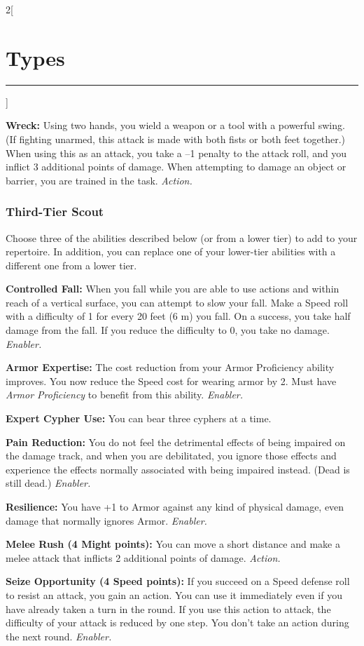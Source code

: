 \documentclass[a4paper,10pt,final]{book}
\newcommand{\HRule}{\rule{\linewidth}{0.5mm}} %
\newcommand{\newSection}[1]{\section*{#1} \addcontentsline{toc}{section}{#1} \label{sec:#1} \HRule}
\newcommand{\itemAbility}[2]{\textcolor{25gray}{\textbullet\textbf{ #1:}} {#2}\par}
\newcommand{\enabler}{\textit{ Enabler.}}
\newcommand{\action}{\textit{ Action.}}
\newenvironment{docsection}[1]
{
  \begin{multicols*}{2}[\newSection{#1}]
}
{
  \end{multicols*}
  \newpage
}
\begin{document}
\begin{docsection}{Types}
\itemAbility{Wreck}{Using two hands, you wield a weapon or a tool with a powerful swing. (If fighting unarmed, this attack is made with both fists or both feet together.) When using this as an attack, you take a –1 penalty to the attack roll, and you inflict 3 additional points of damage. When attempting to damage an object or barrier, you are trained in the task. \action}


\subsubsection*{Third-Tier Scout}
\label{subsub:scoutThirdTier}

Choose three of the abilities described
below (or from a lower tier) to add to your
repertoire. In addition, you can replace one
of your lower-tier abilities with a different
one from a lower tier.

\itemAbility{Controlled Fall}{When you fall while you are able to use actions and within reach of a vertical surface, you can attempt to slow your fall. Make a Speed roll with a difficulty of 1 for every 20 feet (6 m) you fall. On a success, you take half damage from the fall. If you reduce the difficulty to 0, you take no damage.\enabler}

\itemAbility{Armor Expertise}{The cost reduction from your Armor Proficiency ability improves. You now reduce the Speed cost for wearing armor by 2. Must have \textit{Armor Proficiency} to benefit from this ability.\enabler}

\itemAbility{Expert Cypher Use}{You can bear three cyphers at a time.}

\itemAbility{Pain Reduction}{You do not feel the detrimental effects of being impaired on the damage track, and when you are debilitated, you ignore those effects and experience the effects normally associated with being impaired instead. (Dead is still dead.)\enabler}

\itemAbility{Resilience}{You have +1 to Armor against any kind of physical damage, even damage that normally ignores Armor.\enabler}

\itemAbility{Melee Rush (4 Might points)}{You can move a short distance and make a melee attack that inflicts 2 additional points of damage.\action}

\itemAbility{Seize Opportunity (4 Speed points)}{If you succeed on a Speed defense roll to resist an attack, you gain an action. You can use it immediately even if you have already taken a turn in the round. If you use this action to attack, the difficulty of your attack is reduced by one step. You don’t take an action during the next round. \enabler}


\end{docsection}
\end{document}

